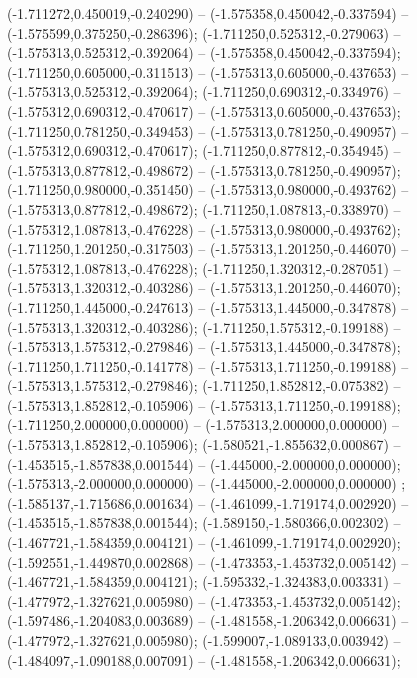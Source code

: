  (-1.711272,0.450019,-0.240290) -- (-1.575358,0.450042,-0.337594) -- (-1.575599,0.375250,-0.286396);
 (-1.711250,0.525312,-0.279063) -- (-1.575313,0.525312,-0.392064) -- (-1.575358,0.450042,-0.337594);
 (-1.711250,0.605000,-0.311513) -- (-1.575313,0.605000,-0.437653) -- (-1.575313,0.525312,-0.392064);
 (-1.711250,0.690312,-0.334976) -- (-1.575312,0.690312,-0.470617) -- (-1.575313,0.605000,-0.437653);
 (-1.711250,0.781250,-0.349453) -- (-1.575313,0.781250,-0.490957) -- (-1.575312,0.690312,-0.470617);
 (-1.711250,0.877812,-0.354945) -- (-1.575313,0.877812,-0.498672) -- (-1.575313,0.781250,-0.490957);
 (-1.711250,0.980000,-0.351450) -- (-1.575313,0.980000,-0.493762) -- (-1.575313,0.877812,-0.498672);
 (-1.711250,1.087813,-0.338970) -- (-1.575312,1.087813,-0.476228) -- (-1.575313,0.980000,-0.493762);
 (-1.711250,1.201250,-0.317503) -- (-1.575313,1.201250,-0.446070) -- (-1.575312,1.087813,-0.476228);
 (-1.711250,1.320312,-0.287051) -- (-1.575313,1.320312,-0.403286) -- (-1.575313,1.201250,-0.446070);
 (-1.711250,1.445000,-0.247613) -- (-1.575313,1.445000,-0.347878) -- (-1.575313,1.320312,-0.403286);
 (-1.711250,1.575312,-0.199188) -- (-1.575313,1.575312,-0.279846) -- (-1.575313,1.445000,-0.347878);
 (-1.711250,1.711250,-0.141778) -- (-1.575313,1.711250,-0.199188) -- (-1.575313,1.575312,-0.279846);
 (-1.711250,1.852812,-0.075382) -- (-1.575313,1.852812,-0.105906) -- (-1.575313,1.711250,-0.199188);
 (-1.711250,2.000000,0.000000) -- (-1.575313,2.000000,0.000000) -- (-1.575313,1.852812,-0.105906);
 (-1.580521,-1.855632,0.000867) -- (-1.453515,-1.857838,0.001544) -- (-1.445000,-2.000000,0.000000);
 (-1.575313,-2.000000,0.000000) -- (-1.445000,-2.000000,0.000000) ;
 (-1.585137,-1.715686,0.001634) -- (-1.461099,-1.719174,0.002920) -- (-1.453515,-1.857838,0.001544);
 (-1.589150,-1.580366,0.002302) -- (-1.467721,-1.584359,0.004121) -- (-1.461099,-1.719174,0.002920);
 (-1.592551,-1.449870,0.002868) -- (-1.473353,-1.453732,0.005142) -- (-1.467721,-1.584359,0.004121);
 (-1.595332,-1.324383,0.003331) -- (-1.477972,-1.327621,0.005980) -- (-1.473353,-1.453732,0.005142);
 (-1.597486,-1.204083,0.003689) -- (-1.481558,-1.206342,0.006631) -- (-1.477972,-1.327621,0.005980);
 (-1.599007,-1.089133,0.003942) -- (-1.484097,-1.090188,0.007091) -- (-1.481558,-1.206342,0.006631);
